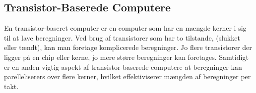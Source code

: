 

\subsection{Transistor-Baserede Computere}
En transistor-baseret computer er en computer som har en mængde kerner i 
sig til at lave beregninger. Ved brug af transistorer som har to tilstande, 
(slukket eller tændt), kan man foretage komplicerede beregninger. Jo 
flere transistorer der ligger på en chip eller kerne, jo mere større 
beregninger kan foretages. Samtidigt er en anden vigtig aspekt af 
transistor-baserede computere at beregninger kan parelleliserers over 
flere kerner, hvilket effektiviserer mængden af beregninger per 
takt.

